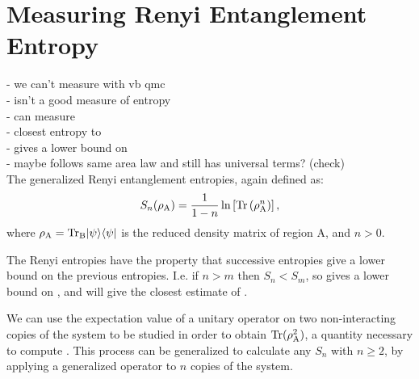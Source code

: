 \chapter{Measuring Renyi Entanglement Entropy}

\noindent
- we can't measure \vn with vb qmc\\
- \vb isn't a good measure of entropy\\
- can measure \re\\
 - closest entropy to \vn\\
 - gives a lower bound on \vn\\
 - maybe follows same area law and still has universal terms? (check)\\
 
The generalized Renyi entanglement entropies, again defined as:
\begin{equation} \label{renyi2}
 	S_n(\rho_{\rm A}) = \frac{1}{1-n}\ln\left[{\rm Tr}\left( \rho_{\rm A}^n \right) \right],
\end{equation}
where $\rho_{\rm{A}}=\rm{Tr}_B\lvert {\psi} \rangle\langle {\psi} \rvert$ is the reduced density matrix of region A, and $n>0$.




The Renyi entropies have the property that successive entropies give a lower bound on the previous entropies.  I.e. if $n>m$ then $S_n<S_m$, so \re gives a lower bound on \vN, and \re will give the closest estimate of \vN.

We can use the expectation value of a unitary \sw operator on two non-interacting copies of the system to be studied in order to obtain ${\rm Tr}(\rho_{\rm A}^2)$, a quantity necessary to compute \re.  
This process can be generalized to calculate any $S_n$ with $n \ge 2$, by applying a generalized \sw operator to $n$ copies of the system. 

